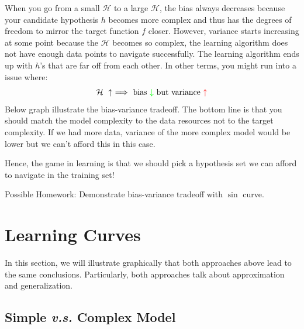 \documentclass[10pt]{article}
\numberwithin{equation}{section}  %
\begin{document}
When you go from a small $\mathcal{H}$ to a large $\mathcal{H}$, the bias always decreases because your candidate hypothesis $h$ becomes more complex and thus has the degrees of freedom to mirror the target function $f$ closer. However, variance starts increasing at some point because the $\mathcal{H}$ becomes so complex, the learning algorithm does not have enough data points to navigate successfully. The learning algorithm ends up with $h$'s that are far off from each other. In other terms, you might run into a issue where:
\begin{equation*}
    \mathcal{H}\ \uparrow\ \Longrightarrow\ \mathrm{bias}\ \textcolor{green}{\downarrow}\ \text{but variance}\ \textcolor{red}{\uparrow}
\end{equation*}
Below graph illustrate the bias-variance tradeoff.
The bottom line is that you should match the model complexity to the data resources not to the target complexity. If we had more data, variance of the more complex model would be lower but we can't afford this in this case.

Hence, the game in learning is that we should pick a hypothesis set we can afford to navigate in the training set!

Possible Homework: Demonstrate bias-variance tradeoff with $\sin$ curve.


\section{Learning Curves}

In this section, we will illustrate graphically that both approaches above lead to the same conclusions. Particularly, both approaches talk about approximation and generalization.

\subsection{Simple \textit{v.s.} Complex Model}
\end{document}
